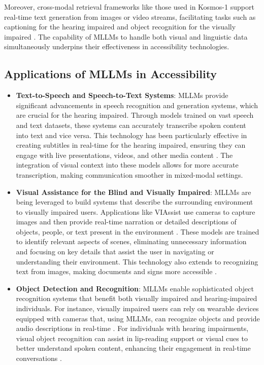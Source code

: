 \documentclass{article}
\begin{document}
Moreover, cross-modal retrieval frameworks like those used in Kosmos-1 support real-time text generation from images or video streams, facilitating tasks such as captioning for the hearing impaired and object recognition for the visually impaired \cite{vs2024gomez}. The capability of MLLMs to handle both visual and linguistic data simultaneously underpins their effectiveness in accessibility technologies.

\subsection{Applications of MLLMs in Accessibility}

\begin{itemize}
    \item \textbf{Text-to-Speech and Speech-to-Text Systems}: MLLMs provide significant advancements in speech recognition and generation systems, which are crucial for the hearing impaired. Through models trained on vast speech and text datasets, these systems can accurately transcribe spoken content into text and vice versa. This technology has been particularly effective in creating subtitles in real-time for the hearing impaired, ensuring they can engage with live presentations, videos, and other media content \cite{vs2023chen,vs2024rao}. The integration of visual context into these models allows for more accurate transcription, making communication smoother in mixed-modal settings.

    \item \textbf{Visual Assistance for the Blind and Visually Impaired}: MLLMs are being leveraged to build systems that describe the surrounding environment to visually impaired users. Applications like VIAssist use cameras to capture images and then provide real-time narration or detailed descriptions of objects, people, or text present in the environment \cite{vs2024yang}. These models are trained to identify relevant aspects of scenes, eliminating unnecessary information and focusing on key details that assist the user in navigating or understanding their environment. This technology also extends to recognizing text from images, making documents and signs more accessible \cite{vs2024song}.

    \item \textbf{Object Detection and Recognition}: MLLMs enable sophisticated object recognition systems that benefit both visually impaired and hearing-impaired individuals. For instance, visually impaired users can rely on wearable devices equipped with cameras that, using MLLMs, can recognize objects and provide audio descriptions in real-time \cite{vs2024li}. For individuals with hearing impairments, visual object recognition can assist in lip-reading support or visual cues to better understand spoken content, enhancing their engagement in real-time conversations \cite{vs2020parde}.


\end{itemize}
\end{document}
